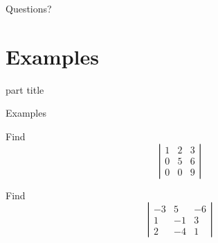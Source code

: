 \documentclass{beamer}
\begin{document}
\begin{frame}
  Questions?
\end{frame}

\section{Examples}

\begin{frame}
  \begin{beamercolorbox}[sep=12pt,center]{part title}
    \insertsection\par
  \end{beamercolorbox}
\end{frame}

\begin{frame}{Examples}
  \begin{example}
    Find
    \begin{equation*}
      \left|
	\begin{array}{ccc}
          1&2&3\\
          0&5&6\\
          0&0&9
	\end{array}
      \right|
    \end{equation*}
  \end{example}
  \begin{example}
    Find
    \begin{equation*}
      \left|
        \begin{array}{ccc}
          -3&5&-6\\
          1&-1&3\\
          2&-4&1
        \end{array}
      \right|
    \end{equation*}
  \end{example}
\end{frame}
\end{document}
